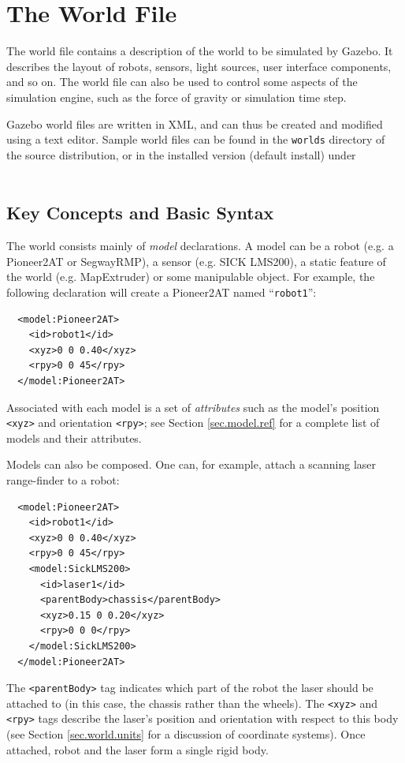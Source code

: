 \documentclass[11pt]{report}
\begin{document}
\chapter{The World File}
\label{sec.worldfile.ref}

The world file contains a description of the world to be simulated by
Gazebo.  It describes the layout of robots, sensors, light sources,
user interface components, and so on.  The world file can also be used
to control some aspects of the simulation engine, such as the force of
gravity or simulation time step.

Gazebo world files are written in XML, and can thus be created and
modified using a text editor.  Sample world files can be found in the
{\tt worlds} directory of the source distribution, or in the installed
version (default install) under 
\\  \\


\section{Key Concepts and Basic Syntax}

The world consists mainly of {\em model} declarations.  A model can be
a robot (e.g. a Pioneer2AT or SegwayRMP), a sensor (e.g. SICK LMS200),
a static feature of the world (e.g. MapExtruder) or some manipulable
object.  
%
For example, the following declaration will create a Pioneer2AT named
``{\tt robot1}'':
\begin{verbatim}
  <model:Pioneer2AT>
    <id>robot1</id>
    <xyz>0 0 0.40</xyz>
    <rpy>0 0 45</rpy>
  </model:Pioneer2AT>
\end{verbatim}
Associated with each model is a set of {\em attributes} such as the
model's position {\tt <xyz>} and orientation {\tt <rpy>}; see Section
\ref{sec.model.ref} for a complete list of models and their
attributes.

Models can also be composed.  One can, for example, attach a scanning
laser range-finder to a robot:
\begin{verbatim}
  <model:Pioneer2AT>
    <id>robot1</id>
    <xyz>0 0 0.40</xyz>
    <rpy>0 0 45</rpy>
    <model:SickLMS200>
      <id>laser1</id>
      <parentBody>chassis</parentBody>
      <xyz>0.15 0 0.20</xyz>
      <rpy>0 0 0</rpy>
    </model:SickLMS200>
  </model:Pioneer2AT>
\end{verbatim}
The {\tt <parentBody>} tag indicates which part of the robot the laser
should be attached to (in this case, the chassis rather than the
wheels).  The {\tt <xyz>} and {\tt <rpy>} tags describe the laser's
position and orientation with respect to this body (see Section
\ref{sec.world.units} for a discussion of coordinate systems).  Once
attached, robot and the laser form a single rigid body.
\end{document}

